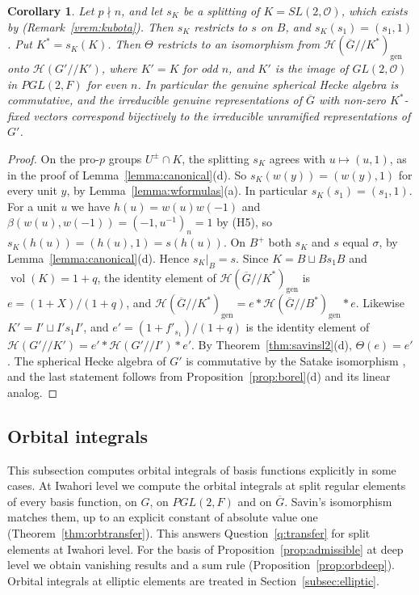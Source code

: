 \documentclass[12pt,letterpaper]{amsart}
\numberwithin{equation}{section}
\newtheorem{corollary}[theorem]{Corollary}
\theoremstyle{definition}
\theoremstyle{remark}
\DeclareMathOperator{\vol}{vol}
\newcommand{\cO}{\mathcal{O}}
\newcommand{\cH}{\mathcal{H}}
\newcommand{\Gbar}{\overline{G}}
\newcommand{\gen}{\mathrm{gen}}
\begin{document}
\begin{corollary}
\label{cor:spherical0}
Let $p\nmid n$, and let $s_K$ be a splitting of $K=SL(2,\cO)$, which
exists by \cite{Ku67} (Remark~\ref{vrem:kubota}). Then $s_K$ restricts
to $s$ on $B$, and $s_K(s_1)=(s_1,1)$. Put $K^*=s_K(K)$. Then $\Theta$
restricts to an isomorphism from $\cH(\Gbar/\!/K^*)_{\gen}$ onto
$\cH(G'/\!/K')$, where $K'=K$ for odd $n$, and $K'$ is the image of
$GL(2,\cO)$ in $PGL(2,F)$ for even $n$. In particular the genuine
spherical Hecke algebra is commutative, and the irreducible genuine
representations of $\Gbar$ with non-zero $K^*$-fixed vectors correspond
bijectively to the irreducible unramified representations of $G'$.
\end{corollary}

\begin{proof}
On the pro-$p$ groups $U^\pm\cap K$, the splitting $s_K$ agrees with
$u\mapsto(u,1)$, as in the proof of Lemma~\ref{lemma:canonical}(d). So
$s_K(w(y))=(w(y),1)$ for every unit $y$, by
Lemma~\ref{lemma:wformulas}(a). In particular $s_K(s_1)=(s_1,1)$. For a
unit $u$ we have $h(u)=w(u)w(-1)$ and $\beta(w(u),w(-1))=(-1,u^{-1})_n
=1$ by (H5), so $s_K(h(u))=(h(u),1)=s(h(u))$. On $B^+$ both $s_K$ and
$s$ equal $\sigma$, by Lemma~\ref{lemma:canonical}(d). Hence
$s_K|_B=s$. Since $K=B\sqcup Bs_1B$ and $\vol(K)=1+q$, the identity
element of $\cH(\Gbar/\!/K^*)_{\gen}$ is $e=(1+X)/(1+q)$, and
$\cH(\Gbar/\!/K^*)_{\gen}=e*\cH(\Gbar/\!/B^*)_{\gen}*e$. Likewise
$K'=I'\sqcup I's_1I'$, and $e'=(1+f'_{s_1})/(1+q)$ is the identity
element of $\cH(G'/\!/K')=e'*\cH(G'/\!/I')*e'$. By
Theorem~\ref{thm:savinsl2}(d), $\Theta(e)=e'$. The spherical Hecke
algebra of $G'$ is commutative by the Satake isomorphism \cite{Ma71},
and the last statement follows from Proposition~\ref{prop:borel}(d) and
its linear analog.
\end{proof}

\subsection{Orbital integrals}
\label{subsec:orbital}
This subsection computes orbital integrals of basis functions
explicitly in some cases. At Iwahori level we compute the orbital
integrals at split regular elements of every basis function, on $G$,
on $PGL(2,F)$ and on $\Gbar$. Savin's isomorphism matches them, up to
an explicit constant of absolute value one
(Theorem~\ref{thm:orbtransfer}). This answers
Question~\ref{q:transfer} for split elements at Iwahori level. For the
basis of Proposition~\ref{prop:admissible} at deep level we obtain
vanishing results and a sum rule (Proposition~\ref{prop:orbdeep}).
Orbital integrals at elliptic elements are treated in
Section~\ref{subsec:elliptic}.
\end{document}
